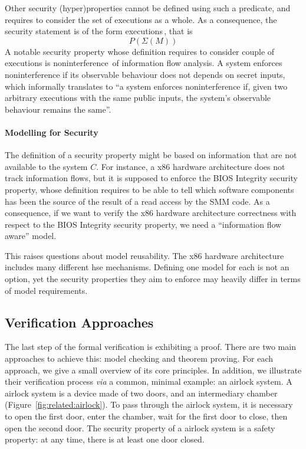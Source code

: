 Other security (hyper)properties cannot be defined using such a predicate, and
requires to consider the set of executions as a whole. As a consequence, the
security statement is of the form
executions\,\cite{clarkson2010hyperproperties}, that is
%
\[
  P(\Sigma(M))
\]
%
A notable security property whose definition requires to consider couple of
executions is noninterference\,\cite{goguen1982security} of information flow
analysis.
%
A system enforces noninterference if its observable behaviour does not depends
on secret inputs, which informally translates to ``a system enforces
noninterference if, given two arbitrary executions with the same public inputs,
the system's observable behaviour remains the same''.

\paragraph{Modelling for Security}
%
The definition of a security property might be based on information that are not
available to the system $C$.
%
For instance, a x86 hardware architecture does not track information flows, but
it is supposed to enforce the BIOS Integrity security property, whose definition
requires to be able to tell which software components has been the source of the
result of a read access by the SMM code.
%
As a consequence, if we want to verify the x86 hardware architecture correctness
with respect to the BIOS Integrity security property, we need a ``information
flow aware'' model.

This raises questions about model reusability.
%
The x86 hardware architecture includes many different \ac{hse} mechanisms.
%
Defining one model for each is not an option, yet the security properties they
aim to enforce may heavily differ in terms of model requirements.

\subsection{Verification Approaches}
\label{subsec:state:approaches}

The last step of the formal verification is exhibiting a proof.
%
There are two main approaches to achieve this: model checking and theorem
proving.
%
For each approach, we give a small overview of its core principles.
%
In addition, we illustrate their verification process \emph{via} a common,
minimal example: an airlock system.
%
A airlock system is a device made of two doors, and an intermediary chamber
(Figure~\ref{fig:related:airlock}).
%
To pass through the airlock system, it is necessary to open the first door,
enter the chamber, wait for the first door to close, then open the second door.
%
The security property of a airlock system is a safety property: at any time,
there is at least one door closed.

